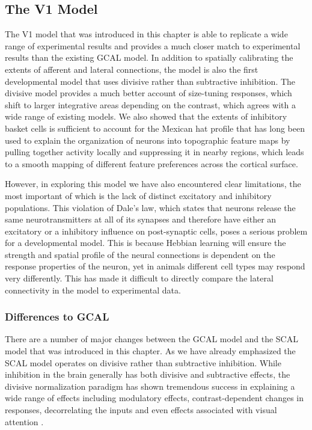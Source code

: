 \subsection{The V1 Model}

The V1 model that was introduced in this chapter is able to replicate
a wide range of experimental results and provides a much closer match
to experimental results than the existing GCAL model. In addition to
spatially calibrating the extents of afferent and lateral connections,
the model is also the first developmental model that uses divisive
rather than subtractive inhibition. The divisive model provides a much
better account of size-tuning responses, which shift to larger
integrative areas depending on the contrast, which agrees with a wide
range of existing models. We also showed that the extents of
inhibitory basket cells is sufficient to account for the Mexican hat
profile that has long been used to explain the organization of neurons
into topographic feature maps by pulling together activity locally and
suppressing it in nearby regions, which leads to a smooth mapping of
different feature preferences across the cortical surface.

However, in exploring this model we have also encountered clear
limitations, the most important of which is the lack of distinct
excitatory and inhibitory populations. This violation of Dale's law,
which states that neurons release the same neurotransmitters at all of
its synapses and therefore have either an excitatory or a inhibitory
influence on post-synaptic cells, poses a serious problem for a
developmental model. This is because Hebbian learning will ensure the
strength and spatial profile of the neural connections is dependent on
the response properties of the neuron, yet in animals different cell
types may respond very differently. This has made it difficult to
directly compare the lateral connectivity in the model to experimental
data.

\subsubsection*{Differences to GCAL}

There are a number of major changes between the GCAL model and the
SCAL model that was introduced in this chapter. As we have already
emphasized the SCAL model operates on divisive rather than subtractive
inhibition. While inhibition in the brain generally has both divisive
and subtractive effects, the divisive normalization paradigm has shown
tremendous success in explaining a wide range of effects including
modulatory effects, contrast-dependent changes in responses,
decorrelating the inputs and even effects associated with visual
attention \citep{Cavanaugh2002a, Graham2011, Carandini2012,
  Reynaud2012, Coen2015}.

